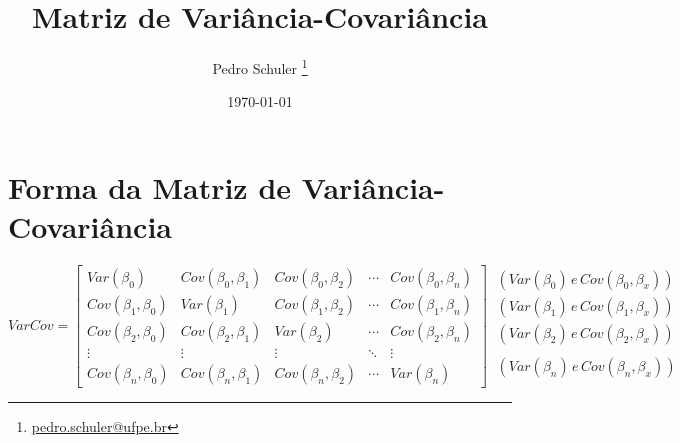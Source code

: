 \documentclass[12pt,a4paper,titlepage=false]{scrartcl}
\title{Matriz de Variância-Covariância}
\author{Pedro Schuler \thanks{\href{mailto:pedro.schuler@ufpe.br}{pedro.schuler@ufpe.br}}}
\date{\today}
\begin{document}
\maketitle

\section{Forma da Matriz de Variância-Covariância}
\[
	VarCov =
	\begin{bmatrix}
		Var(\beta_{0})           & Cov(\beta_{0},\beta_{1}) & Cov(\beta_{0},\beta_{2}) & \cdots & Cov(\beta_{0},\beta_{n}) \\
		Cov(\beta_{1},\beta_{0}) & Var(\beta_{1})           & Cov(\beta_{1},\beta_{2}) & \cdots & Cov(\beta_{1},\beta_{n}) \\
		Cov(\beta_{2},\beta_{0}) & Cov(\beta_{2},\beta_{1}) & Var(\beta_{2})           & \cdots & Cov(\beta_{2},\beta_{n}) \\
		\vdots                   & \vdots                   & \vdots                   & \ddots & \vdots                   \\
		Cov(\beta_{n},\beta_{0}) & Cov(\beta_{n},\beta_{1}) & Cov(\beta_{n},\beta_{2}) & \cdots & Var(\beta_{n})
	\end{bmatrix}~
	\begin{array}{c}
		(Var(\beta_{0}) \, e \, Cov(\beta_{0},\beta_{x})) \\
		(Var(\beta_{1}) \, e \, Cov(\beta_{1},\beta_{x})) \\
		(Var(\beta_{2}) \, e \, Cov(\beta_{2},\beta_{x})) \\
		\\
		(Var(\beta_{n}) \, e \, Cov(\beta_{n},\beta_{x})) \\
	\end{array}
\]
\end{document}

